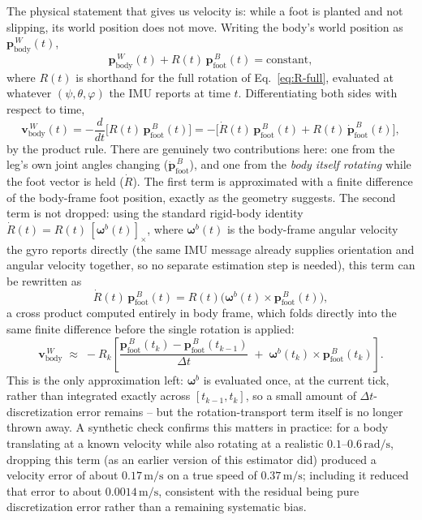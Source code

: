 \documentclass[11pt]{article}
\begin{document}
The physical statement that gives us velocity is: while a foot is planted
and not slipping, its world position does not move. Writing the body's
world position as $\mathbf{p}_{\text{body}}^{\,W}(t)$,
\begin{equation}
\mathbf{p}_{\text{body}}^{\,W}(t) + R(t)\,\mathbf{p}_{\text{foot}}^{\,B}(t) = \text{constant},
\end{equation}
where $R(t)$ is shorthand for the full rotation of Eq.~\eqref{eq:R-full},
evaluated at whatever $(\psi,\theta,\varphi)$ the IMU reports at time $t$.
Differentiating both sides with respect to time,
\begin{equation}
\mathbf{v}_{\text{body}}^{\,W}(t) = -\frac{d}{dt}\Big[R(t)\,\mathbf{p}_{\text{foot}}^{\,B}(t)\Big]
= -\Big[\dot{R}(t)\,\mathbf{p}_{\text{foot}}^{\,B}(t) + R(t)\,\dot{\mathbf{p}}_{\text{foot}}^{\,B}(t)\Big],
\label{eq:product-rule}
\end{equation}
by the product rule. There are genuinely two contributions here: one from
the leg's own joint angles changing ($\dot{\mathbf{p}}_{\text{foot}}^{\,B}$), and
one from the \emph{body itself rotating} while the foot vector is held
($\dot R$). The first term is approximated with a finite difference of the
body-frame foot position, exactly as the geometry suggests. The second term
is not dropped: using the standard rigid-body identity
$\dot R(t) = R(t)\,[\boldsymbol\omega^{b}(t)]_\times$, where $\boldsymbol\omega^{b}(t)$
is the body-frame angular velocity the gyro reports directly (the same
IMU message already supplies orientation and angular velocity together, so
no separate estimation step is needed), this term can be rewritten as
\begin{equation}
\dot R(t)\,\mathbf{p}_{\text{foot}}^{\,B}(t) = R(t)\Big(\boldsymbol\omega^{b}(t) \times \mathbf{p}_{\text{foot}}^{\,B}(t)\Big),
\end{equation}
a cross product computed entirely in body frame, which folds directly into
the same finite difference before the single rotation is applied:
\begin{equation}
\mathbf{v}_{\text{body}}^{\,W} \;\approx\; -R_k \left[\frac{\mathbf{p}_{\text{foot}}^{\,B}(t_k) - \mathbf{p}_{\text{foot}}^{\,B}(t_{k-1})}{\Delta t} \;+\; \boldsymbol\omega^{b}(t_k) \times \mathbf{p}_{\text{foot}}^{\,B}(t_k)\right].
\label{eq:vel-approx}
\end{equation}
This is the only approximation left: $\boldsymbol\omega^{b}$ is evaluated once,
at the current tick, rather than integrated exactly across
$[t_{k-1}, t_k]$, so a small amount of $\Delta t$-discretization error
remains -- but the rotation-transport term itself is no longer thrown away.
A synthetic check confirms this matters in practice: for a body translating
at a known velocity while also rotating at a realistic
$0.1$--$0.6\,\text{rad/s}$, dropping this term (as an earlier version of
this estimator did) produced a velocity error of about
$0.17\,\text{m/s}$ on a true speed of $0.37\,\text{m/s}$; including it
reduced that error to about $0.0014\,\text{m/s}$, consistent with the
residual being pure discretization error rather than a remaining
systematic bias.
\end{document}
